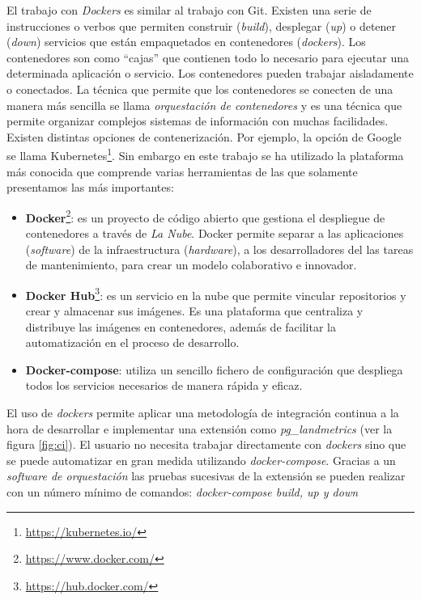 El trabajo con \textit{Dockers} es similar al trabajo con Git. Existen una serie de instrucciones o verbos que permiten construir (\textit{build}), desplegar (\textit{up}) o detener (\textit{down}) servicios que están empaquetados en contenedores (\textit{dockers}). Los contenedores son como ``cajas'' que contienen todo lo necesario para ejecutar una determinada aplicación o servicio. Los contenedores pueden trabajar aisladamente o conectados. La técnica que permite que los contenedores se conecten de una manera más sencilla se llama \textit{orquestación de contenedores} y es una técnica que permite organizar complejos sistemas de información con muchas facilidades. Existen distintas opciones de contenerización. Por ejemplo, la opción de Google se llama Kubernetes\footnote{\href{https://kubernetes.io/}{https://kubernetes.io/}}. Sin embargo en este trabajo se ha utilizado la plataforma más conocida que comprende varias herramientas de las que solamente presentamos las más importantes:

\begin{itemize}
\item\textbf{Docker}\footnote{\url{https://www.docker.com/}}: es un proyecto de código abierto que gestiona el despliegue de contenedores a través de \textit{La Nube}. Docker permite separar a las aplicaciones (\textit{software}) de la infraestructura (\textit{hardware}), a los desarrolladores del las tareas de mantenimiento, para crear un modelo colaborativo e innovador.
\item\textbf{Docker Hub}\footnote{\url{https://hub.docker.com/}}: es un servicio en la nube que permite vincular repositorios y crear y almacenar sus imágenes. Es una plataforma que centraliza y distribuye las imágenes en contenedores, además de facilitar la automatización en el proceso de desarrollo.
\item\textbf{Docker-compose}: utiliza un sencillo fichero de configuración que despliega todos los servicios necesarios de manera rápida y eficaz.
\end{itemize}

El uso de \textit{dockers} permite aplicar una metodología de integración continua a la hora de desarrollar e implementar una extensión como \textit{pg\_landmetrics} (ver la figura \ref{fig:ci}). El usuario no necesita trabajar directamente con \textit{dockers} sino que se puede automatizar en gran medida utilizando \textit{docker-compose}. Gracias a un \textit{software de orquestación} las pruebas sucesivas de la extensión se pueden realizar con un número mínimo de comandos: \textit{docker-compose build, up y down}

